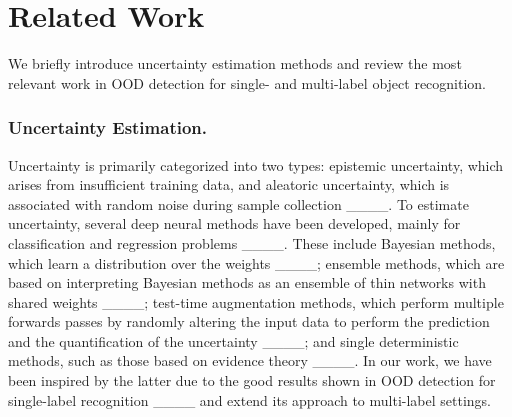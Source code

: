 \section{Related Work}
\label{sec:relatedwork}

\begin{comment}

____
____
____
____
____
____
\end{comment}

We briefly introduce uncertainty estimation methods and review the most relevant work in OOD detection for single- and multi-label object recognition.

\subsubsection{Uncertainty Estimation.}
Uncertainty is primarily categorized into two types: epistemic uncertainty, which arises from insufficient training data, and aleatoric uncertainty, which is associated with random noise during sample collection ____.
To estimate uncertainty, several deep neural methods have been developed, mainly for classification and regression problems ____. These include Bayesian methods, which learn a distribution over the weights ____;  ensemble methods, which are based on interpreting Bayesian methods as an ensemble of thin networks with shared weights ____; test-time augmentation methods, which perform multiple forwards passes by randomly altering the input data to perform the prediction and the quantification of the uncertainty ____; and single deterministic methods, such as those based on evidence theory ____. In our work, we have been inspired by the latter due to the good results shown in OOD detection for single-label recognition ____ and extend its approach to multi-label settings. 

